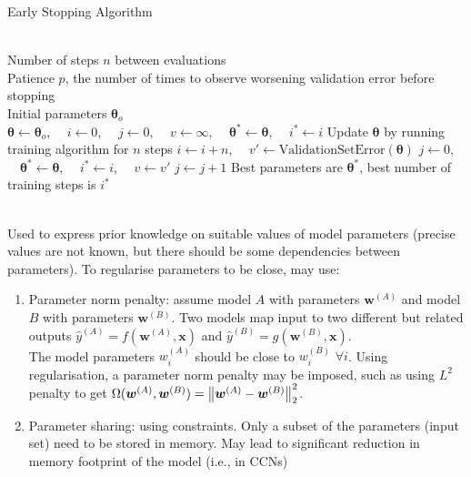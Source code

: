 \begin{breakablealgorithm}
\caption{Early Stopping Algorithm}
\begin{algorithmic}
\Require \\
Number of steps $n$ between evaluations\\
Patience $p$, the number of times to observe worsening validation error before stopping\\
Initial parameters $\bm{\theta}_o$\\
    
\State $\bm{\theta} \leftarrow \bm{\theta}_o$, \ \ $i \leftarrow 0$, \ \ $j \leftarrow 0$, \ \ $v \leftarrow \infty$, \ \ $\bm{\theta}^{*} \leftarrow \bm{\theta}$, \ \ $i^* \leftarrow i$
\State Update $\bm{\theta}$ by running training algorithm for $n$ steps
\State $i \leftarrow i + n$, \ \ $v' \leftarrow \text{ValidationSetError}(\bm{\theta})$
\State $j \leftarrow 0$, \ \ $\bm{\theta}^{*} \leftarrow \bm{\theta}$, \ \ $i^* \leftarrow i$, \ \ $v \leftarrow v'$
\EndIf
\State $j \leftarrow j+1$
\EndWhile
\State Best parameters are $\bm{\theta}^*$, best number of training steps is $i^*$

\end{algorithmic}
\end{breakablealgorithm}

\begin{remark} \\
Used to express prior knowledge on suitable values of model parameters (precise values are not known, but there should be some dependencies between parameters). To regularise parameters to be close, may use:
\begin{enumerate}[label=\roman*.]
\setlength{\itemsep}{0pt}
\item Parameter norm penalty: assume model $A$ with parameters $\bm{w}^{(A)}$ and model $B$ with parameters $\bm{w}^{(B)}$. Two models map input to two different but related outputs $\hat{y}^{(A)} = f(\bm{w}^{(A)}, \bm{x})$ and $\hat{y}^{(B)} = g(\bm{w}^{(B)}, \bm{x})$.\\
The model parameters $w_{i}^{(A)}$ should be close to  $w_{i}^{(B)}$ $\forall i$. Using regularisation, a parameter norm penalty may be imposed, such as using $L^2$ penalty to get $\Omega(\bm{w}^{(A)}, \bm{w}^{(B)}) = \left\lVert\bm{w}^{(A)} - \bm{w}^{(B)}\right\rVert^2_2$.
\item Parameter sharing: using constraints. Only a subset of the parameters (input set) need to be stored in memory. May lead to significant reduction in memory footprint of the model (i.e., in CCNs)
\end{enumerate}
\end{remark}

